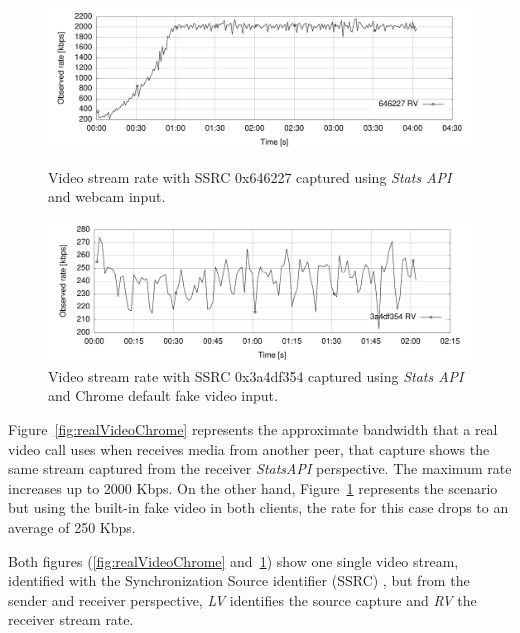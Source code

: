  \begin{figure}[h]
  \centering
   \includegraphics[width=1\textwidth]{./figures/realVideoChrome.pdf}
     \caption[Video stream rate with SSRC 0x646227 captured using {\it Stats API} and webcam input]{Video stream rate with SSRC 0x646227 captured using {\it Stats API} and webcam input.}
	\label{fig:realVideoChrome}
  \centering
	\includegraphics[width=1\textwidth]{./figures/automatedVideoChrome.pdf}
	\caption[Video stream rate with SSRC 0x3a4df354 captured using {\it Stats API} and Chrome default fake content]{Video stream rate with SSRC 0x3a4df354 captured using {\it Stats API} and Chrome default fake video input.}
	\label{fig:automatedVideoChrome}
\end{figure}

Figure~\ref{fig:realVideoChrome} represents the approximate bandwidth that a real video call uses when receives media from another peer, that capture shows the same stream captured from the receiver {\it StatsAPI} perspective. The maximum rate increases up to 2000 Kbps. On the other hand, Figure~\ref{fig:automatedVideoChrome} represents the scenario but using the built-in fake video in both clients, the rate for this case drops to an average of 250 Kbps. 

Both figures (\ref{fig:realVideoChrome} and~\ref{fig:automatedVideoChrome}) show one single video stream, identified with the Synchronization Source identifier (SSRC) , but from the sender and receiver perspective, {\it LV} identifies the source capture and {\it RV} the receiver stream rate. 

